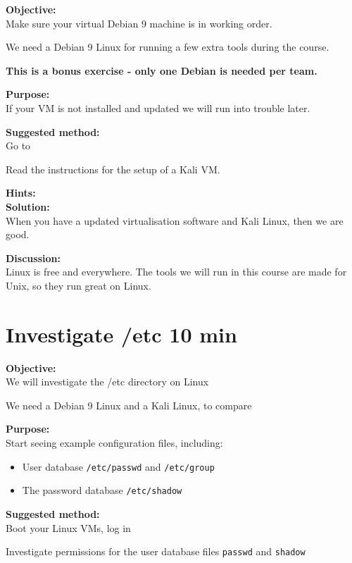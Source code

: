 \documentclass[a4paper,11pt,notitlepage]{report}
\begin{document}

{\bf Objective:}\\
Make sure your virtual Debian 9 machine is in working order.

We need a Debian 9 Linux for running a few extra tools during the course.

{\Large \bf This is a bonus exercise - only one Debian is needed per team.}

{\bf Purpose:}\\
If your VM is not installed and updated we will run into trouble later.

{\bf Suggested method:}\\
Go to 

Read the instructions for the setup of a Kali VM.

{\bf Hints:}\\

{\bf Solution:}\\
When you have a updated virtualisation software and Kali Linux, then we are good.

{\bf Discussion:}\\
Linux is free and everywhere. The tools we will run in this course are made for Unix, so they run great on Linux.



\chapter{Investigate /etc 10 min}
\label{ex:basicLinuxetc}


{\bf Objective:}\\
We will investigate the /etc directory on Linux

We need a Debian 9 Linux and a Kali Linux, to compare


{\bf Purpose:}\\
Start seeing example configuration files, including:
\begin{itemize}
  \item User database \verb+/etc/passwd+ and \verb+/etc/group+
  \item The password database \verb+/etc/shadow+
\end{itemize}

{\bf Suggested method:}\\
Boot your Linux VMs, log in

Investigate permissions for the user database files \verb+passwd+ and \verb+shadow+
\end{document}
